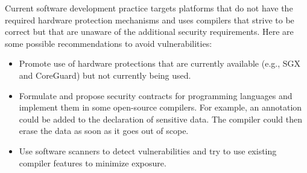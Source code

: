 Current software development practice targets platforms that do not have the required hardware protection mechanisms and uses compilers that strive to be correct but that are unaware of the additional security requirements. Here are some possible recommendations to avoid vulnerabilities:
\begin{itemize}
	\item Promote use of hardware protections that are currently available (e.g., SGX and CoreGuard) but not currently being used.
	\item Formulate and propose security contracts for programming languages and implement them in some open-source compilers. For example, an annotation could be added to the declaration of sensitive data. The compiler could then erase the data as soon as it goes out of scope.
	\item Use software scanners to detect vulnerabilities and try to use existing compiler features to minimize exposure.
\end{itemize}
